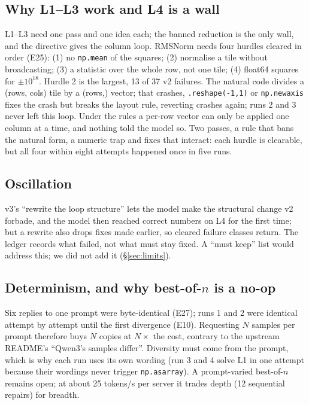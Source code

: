 \documentclass[11pt]{article}
\newcommand{\code}[1]{\texttt{#1}}
\newcommand{\E}[1]{E#1}
\begin{document}
\subsection{Why L1--L3 work and L4 is a wall}
L1--L3 need one pass and one idea each; the banned reduction is the only wall, and the directive gives
the column loop. RMSNorm needs four hurdles cleared in order (\E{25}): (1) no \code{np.mean} of the
squares; (2) normalise a tile without broadcasting; (3) a statistic over the whole row, not one tile;
(4) float64 squares for $\pm10^{18}$. Hurdle 2 is the largest, 13 of 37 v2 failures. The natural code
divides a (rows, cols) tile by a (rows,) vector; that crashes, \code{.reshape(-1,1)} or
\code{np.newaxis} fixes the crash but breaks the layout rule, reverting crashes again; runs 2 and 3 never
left this loop. Under the rules a per-row vector can only be applied one column at a time, and nothing
told the model so. Two passes, a rule that bans the natural form, a numeric trap and fixes that interact:
each hurdle is clearable, but all four within eight attempts happened once in five runs.

\subsection{Oscillation}
v3's ``rewrite the loop structure'' lets the model make the structural change v2 forbade, and the
model then reached correct numbers on L4 for the first time; but a rewrite also drops fixes made
earlier, so cleared failure classes return. The ledger records what failed, not what must stay fixed.
A ``must keep'' list would address this; we did not add it (\S\ref{sec:limits}).

\subsection{\texorpdfstring{Determinism, and why best-of-$n$ is a no-op}{Determinism, and why best-of-n is a no-op}}
Six replies to one prompt were byte-identical (\E{27}); runs 1 and 2 were identical attempt by attempt
until the first divergence (\E{10}). Requesting $N$ samples per prompt therefore buys $N$ copies at
$N\times$ the cost, contrary to the upstream README's ``Qwen3's samples differ''. Diversity must come
from the prompt, which is why each run uses its own wording (run 3 and 4 solve L1 in one attempt because
their wordings never trigger \code{np.asarray}). A prompt-varied best-of-$n$ remains open; at about
25 tokens/s per server it trades depth (12 sequential repairs) for breadth.
\end{document}
